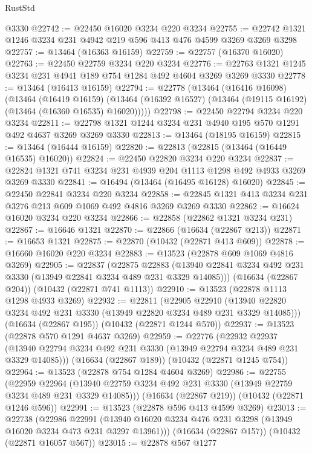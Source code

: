 \begin{lexlean}{RustStd}
\begin{coremodule}
    @3330
@22742 := @22450 @16020 @3234 @220 @3234
@22755 := @22742 @1321 @1246 @3234 @231 @4942 @219 @596 @413 @476 @4599 @3269 @3269 @3298
@22757 := @13464 (@16363 @16159)
@22759 := @22757 (@16370 @16020)
@22763 := @22450 @22759 @3234 @220 @3234
@22776 := @22763 @1321 @1245 @3234 @231 @4941 @189 @754 @1284 @492 @4604 @3269 @3269 @3330
@22778 := @13464 (@16413 @16159)
@22794 := @22778
    (@13464
      (@16416 @16098)
      (@13464
        (@16419 @16159)
        (@13464 (@16392 @16527) (@13464 (@19115 @16192) (@13464 (@16360 @16535) @16020)))))
@22798 := @22450 @22794 @3234 @220 @3234
@22811 := @22798 @1321 @1244 @3234 @231 @4940 @195 @570 @1291 @492 @4637 @3269 @3269 @3330
@22813 := @13464 (@18195 @16159)
@22815 := @13464 (@16444 @16159)
@22820 := @22813 (@22815 (@13464 (@16449 @16535) @16020))
@22824 := @22450 @22820 @3234 @220 @3234
@22837 := @22824 @1321 @741 @3234 @231 @4939 @204 @1113 @1298 @492 @4933 @3269 @3269 @3330
@22841 := @16494 (@13464 (@16495 @16128) @16020)
@22845 := @22450 @22841 @3234 @220 @3234
@22858 := @22845 @1321 @413 @3234 @231 @3276 @213 @609 @1069 @492 @4816 @3269 @3269 @3330
@22862 := @16624 @16020 @3234 @220 @3234
@22866 := @22858 (@22862 @1321 @3234 @231)
@22867 := @16646 @1321
@22870 := @22866 (@16634 (@22867 @213))
@22871 := @16653 @1321
@22875 := @22870 (@10432 (@22871 @413 @609))
@22878 := @16660 @16020 @220 @3234
@22883 := @13523 (@22878 @609 @1069 @4816 @3269)
@22905 := @22837
    (@22875
      @22883
      (@13940 @22841 @3234 @492 @231 @3330 (@13949 @22841 @3234 @489 @231 @3329 @14085)))
    (@16634 (@22867 @204))
    (@10432 (@22871 @741 @1113))
@22910 := @13523 (@22878 @1113 @1298 @4933 @3269)
@22932 := @22811
    (@22905
      @22910
      (@13940 @22820 @3234 @492 @231 @3330 (@13949 @22820 @3234 @489 @231 @3329 @14085)))
    (@16634 (@22867 @195))
    (@10432 (@22871 @1244 @570))
@22937 := @13523 (@22878 @570 @1291 @4637 @3269)
@22959 := @22776
    (@22932
      @22937
      (@13940 @22794 @3234 @492 @231 @3330 (@13949 @22794 @3234 @489 @231 @3329 @14085)))
    (@16634 (@22867 @189))
    (@10432 (@22871 @1245 @754))
@22964 := @13523 (@22878 @754 @1284 @4604 @3269)
@22986 := @22755
    (@22959
      @22964
      (@13940 @22759 @3234 @492 @231 @3330 (@13949 @22759 @3234 @489 @231 @3329 @14085)))
    (@16634 (@22867 @219))
    (@10432 (@22871 @1246 @596))
@22991 := @13523 (@22878 @596 @413 @4599 @3269)
@23013 := @22738
    (@22986
      @22991
      (@13940 @16020 @3234 @476 @231 @3298 (@13949 @16020 @3234 @473 @231 @3297 @13961)))
    (@16634 (@22867 @157))
    (@10432 (@22871 @16057 @567))
@23015 := @22878 @567 @1277

\end{coremodule}
\end{lexlean}
